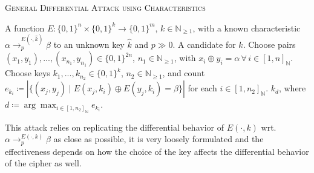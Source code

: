\documentclass[10pt]{amsart}
\theoremstyle{definition}
\theoremstyle{remark}
\begin{document}
    {\centering\begin{minipage}{\linewidth}
        \vspace{-0.25cm}
        \begin{algorithm}[H]
            \caption{\textsc{General Differential Attack using Characteristics}}
            \label{algo:general_differential_attack_using_characteristics}
            \begin{algorithmic}[1]
                \Require A function \(E\colon \{0, 1\}^n \times \{0, 1\}^k \to \{0, 1\}^m\), \(k \in \mathbb{N}_{\geq 1}\), with a known characteristic \(\alpha \to_p^{E(\cdot, \hat{k})} \beta\) to an unknown key \(\hat{k}\) and \(p \gg 0\).
                \Ensure A candidate for \(\hat{k}\).
                \State Choose pairs \((x_1, y_1), ..., (x_{n_1}, y_{n_1}) \in \{0, 1\}^{2n}\), \(n_1 \in \mathbb{N}_{\geq 1}\), with \(x_i \oplus y_i = \alpha \, \forall \, i \in [1, n]_{\mathbb{N}}\).
                \State Choose keys \(k_1, ..., k_{n_2} \in \{0, 1\}^k\), \(n_2 \in \mathbb{N}_{\geq 1}\), and count \(e_{k_i} \coloneqq |\{(x_j,y_j) \mid E(x_j, k_i) \oplus E(y_j, k_i) = \beta\}|\) for each \(i \in [1, n_2]_{\mathbb{N}}\).
                \State \Return \(k_d\), where \(d \coloneqq \arg\max_{i \in [1, n_2]_{\mathbb{N}}} e_{k_i}\).
            \end{algorithmic}
        \end{algorithm}
    \end{minipage}\par}

    \phantom{}

    This attack relies on replicating the differential behavior of \(E(\cdot, k)\) wrt. \(\alpha \to_p^{E(\cdot, k)} \beta\) as close as possible, it is very loosely formulated and the effectiveness depends on how the choice of the key affects the differential behavior of the cipher as well.
    
\end{document}
